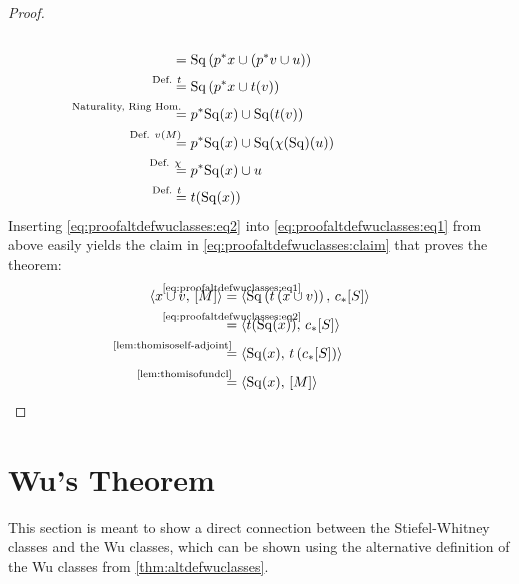 \begin{Thm}
\begin{proof}
\begin{align}
      \\\notag
      &=
        \SQ\left(\pb p x\cup \left(\pb p\vu \cup \U\right)\right)
      \\\notag
      &\equalsby{Def. $\thomiso$}
       \SQ\left(\pb p x\cup \thomiso(\vu)\right)
      \\\notag
      &\equalsby{Naturality, Ring Hom.}
        \pb p\SQ(x) \cup \SQ(\thomiso(\vu))
      \\\notag
      &\equalsby{Def. $\V{M}$}
        \pb p\SQ(x) \cup \SQ(\antipode(\SQ)(u))
      \\\notag
      &\equalsby{Def. $\antipode$}
        \pb p\SQ(x) \cup u
      \\\label{eq:proofaltdefwuclasses:eq2}
      &\equalsby{Def. $\thomiso$}
        \thomiso(\SQ(x))
    \end{align}
    Inserting \eqref{eq:proofaltdefwuclasses:eq2} into
    \eqref{eq:proofaltdefwuclasses:eq1} from above easily yields the
    claim in \eqref{eq:proofaltdefwuclasses:claim} that proves the theorem:
    \begin{align*}
      \capped{x\cup \vu}{\fundcl M}
      &\cequalsby{\eqref{eq:proofaltdefwuclasses:eq1}}
        \capped
        {\SQ\left(\thomiso\left(x\cup\vu\right)\right)}
        {\pf\collapse\fundcl{\Sph}}
      \\
      &\cequalsby{\eqref{eq:proofaltdefwuclasses:eq2}}
        \capped
        {\thomiso(\SQ(x))}
        {\pf\collapse\fundcl{\Sph}}
      \\
      &\equalsby{\autoref{lem:thomisoself-adjoint}}
        \capped
        {\SQ(x)}
        {\thomiso\left(\pf\collapse\fundcl{\Sph}\right)}
      \\
      &\equalsby{\autoref{lem:thomisofundcl}}
        \capped
        {\SQ(x)}
        {\fundcl M}
        \qedhere
    \end{align*}
  \end{proof}
\end{Thm}


\section[Wu's Theorem]{Wu's Theorem}
This section is meant to show a direct connection between the
Stiefel-Whitney classes and the Wu classes, which can be shown using
the alternative definition of the Wu classes from
\autoref{thm:altdefwuclasses}.

